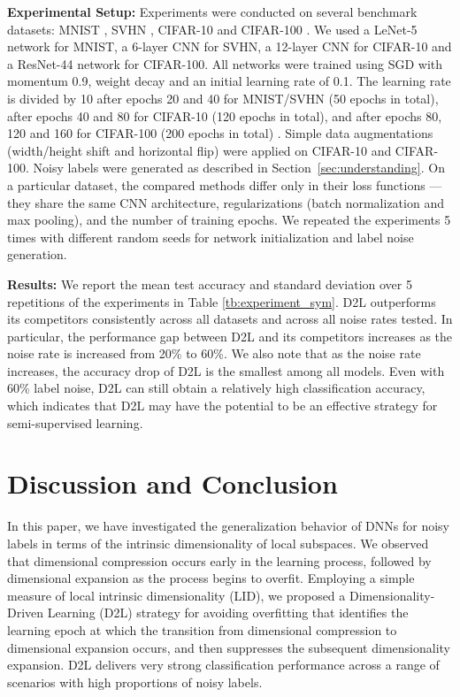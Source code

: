 \documentclass{article}
\begin{document}
\textbf{Experimental Setup:} Experiments were conducted on several benchmark datasets: MNIST \cite{lecun1998gradient}, SVHN \cite{netzer2011reading}, CIFAR-10 \cite{krizhevsky2009learning} and CIFAR-100 \cite{krizhevsky2009learning}. We used a LeNet-5 network \cite{lecun1998gradient} for MNIST, a 6-layer CNN for SVHN, a 12-layer CNN for CIFAR-10 and a ResNet-44 network \cite{he2016deep} for CIFAR-100. 
All networks were trained using SGD with momentum 0.9, weight decay  and an initial learning rate of 0.1. The learning rate is divided by 10 after epochs 20 and 40 for MNIST/SVHN (50 epochs in total), after epochs 40 and 80 for CIFAR-10 (120 epochs in total), and after epochs 80, 120 and 160 for CIFAR-100 (200 epochs in total) \cite{huang2016deep}. 
Simple data augmentations (width/height shift and horizontal flip) were applied on CIFAR-10 and CIFAR-100. Noisy labels were generated as described in Section~\ref{sec:understanding}. On a particular dataset, the compared methods differ only in their loss functions --- they share the same CNN architecture, regularizations (batch normalization and max pooling), and the number of training epochs. We repeated the experiments 5 times with different random seeds for network initialization and label noise generation.

\textbf{Results:} We report the mean test accuracy and standard deviation over 5 repetitions of the experiments
in Table \ref{tb:experiment_sym}. D2L outperforms its competitors consistently across all datasets and across all noise rates tested. In particular, the performance gap between D2L and its competitors increases as the noise rate is increased from 20\% to 60\%. We also note that as the noise rate increases, the accuracy drop of D2L is the smallest among all models. Even with 60\% label noise, D2L can still obtain a relatively high classification accuracy, which indicates that D2L may have the potential to be an effective strategy for semi-supervised learning. 




\section{Discussion and Conclusion}
In this paper, we have investigated the generalization behavior of DNNs for noisy labels in terms of the intrinsic dimensionality of local subspaces. We observed that dimensional compression occurs early in the learning process, followed by dimensional expansion as the process begins to overfit. Employing a simple measure of local intrinsic dimensionality (LID), we proposed a Dimensionality-Driven Learning (D2L) strategy for avoiding overfitting that identifies the learning epoch at which the transition from dimensional compression to dimensional expansion occurs, and then suppresses the subsequent dimensionality expansion. D2L delivers very strong classification performance across a range of scenarios with high proportions of noisy labels.   
\end{document}
